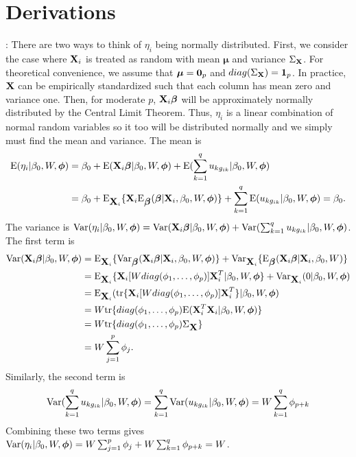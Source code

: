 \documentclass[12pt]{article}
\begin{document}
\section{Derivations}
: There are two ways to think of $\eta_i$ being normally distributed. First, we consider the case where $\mbox{\bf X}_i$ is treated as random with mean $\boldsymbol\mu$ and variance $\Sigma_{{\bf X}}$. For theoretical convenience, we assume that $\boldsymbol\mu={\bf 0}_p$ and $diag(\Sigma_{{\bf X}})={\bf 1}_p$. In practice, $\mbox{\bf X}$ can be empirically standardized such that each column has mean zero and variance one. Then, for moderate $p$, $\mbox{\bf X}_i\mbox{\boldmath $\beta$}$ will be approximately normally distributed by the Central Limit Theorem. Thus, $\eta_i$ is a linear combination of normal random variables so it too will be distributed normally and we simply must find the mean and variance. The mean is
\begin{align}
    \mbox{E}(\eta_i|\beta_0,W,\boldsymbol\phi)
    &=\beta_0 + \mbox{E}(\mbox{\bf X}_i\mbox{\boldmath $\beta$}|\beta_0,W,\boldsymbol\phi)
    + \mbox{E}(\sum_{k=1}^q u_{kg_{ik}}|\beta_0,W,\boldsymbol\phi)\\
    &=\beta_0 + \mbox{E}_{\mbox{\bf X}_i}\{\mbox{\bf X}_i\mbox{E}_{\mbox{\boldmath $\beta$}}(\mbox{\boldmath $\beta$}|\mbox{\bf X}_i,\beta_0,W,\boldsymbol\phi)\} + \sum_{k=1}^q  \mbox{E}(u_{kg_{ik}}|\beta_0,W,\boldsymbol\phi)=\beta_0.\nonumber
\end{align}
The variance is $\mbox{Var}(\eta_i|\beta_0,W,\boldsymbol\phi)
    =\mbox{Var}(\mbox{\bf X}_i\mbox{\boldmath $\beta$}|\beta_0,W,\boldsymbol\phi) +\mbox{Var}(\sum_{k=1}^q u_{kg_{ik}}|\beta_0,W,\boldsymbol\phi)$. The first term is
\begin{align}
    \mbox{Var}(\mbox{\bf X}_i\mbox{\boldmath $\beta$}|\beta_0,W,\boldsymbol\phi)
    &=\mbox{E}_{\mbox{\bf X}_i}\{\mbox{Var}_{\mbox{\boldmath $\beta$}}(\mbox{\bf X}_i\mbox{\boldmath $\beta$}|\mbox{\bf X}_i,\beta_0,W,\boldsymbol\phi)\} + \mbox{Var}_{\mbox{\bf X}_i}\{\mbox{E}_{\mbox{\boldmath $\beta$}}(\mbox{\bf X}_i\mbox{\boldmath $\beta$}|\mbox{\bf X}_i,\beta_0,W)\}\\
    &=\mbox{E}_{\mbox{\bf X}_i}\{\mbox{\bf X}_i [W diag(\phi_1,\dots,\phi_p)]\mbox{\bf X}_i^T|\beta_0,W,\boldsymbol\phi\} + \mbox{Var}_{\mbox{\bf X}_i}(0|\beta_0,W,\boldsymbol\phi)\nonumber\\
    &=\mbox{E}_{\mbox{\bf X}_i}(\mbox{tr}\{\mbox{\bf X}_i [W diag(\phi_1,\dots,\phi_p)]\mbox{\bf X}_i^T\}|\beta_0,W,\boldsymbol\phi)\nonumber\\
    &=W\mbox{tr}\{diag(\phi_1,\dots,\phi_p)\mbox{E}(\mbox{\bf X}_i^T\mbox{\bf X}_i|\beta_0,W,\boldsymbol\phi)\}\nonumber\\
   &=W\mbox{tr}\{diag(\phi_1,\dots,\phi_p)\Sigma_{\mbox{\bf X}}\}\\
   &=W\sum_{j=1}^p \phi_j.\nonumber
\end{align}
Similarly, the second term is
\begin{align}
    \mbox{Var}(\sum_{k=1}^q u_{kg_{ik}}|\beta_0,W,\boldsymbol\phi)
    =\sum_{k=1}^q \mbox{Var}(u_{kg_{ik}}|\beta_0,W,\boldsymbol\phi)
    =W\sum_{k=1}^q\phi_{p+k}
\end{align}
Combining these two terms gives $\mbox{Var}(\eta_i|\beta_0,W,\boldsymbol\phi)
    = W\sum_{j=1}^p\phi_j +W\sum_{k=1}^q \phi_{p+k}=W
$.
\end{document}

